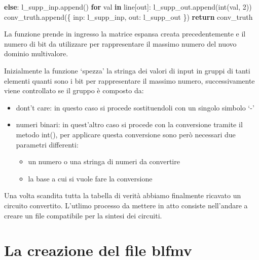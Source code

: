 \documentclass[
  italian,
]{book}
\newenvironment{Shaded}{\begin{snugshade}}{\end{snugshade}}
\newcommand{\BuiltInTok}[1]{#1}
\newcommand{\ControlFlowTok}[1]{\textcolor[rgb]{0.13,0.29,0.53}{\textbf{#1}}}
\newcommand{\DecValTok}[1]{\textcolor[rgb]{0.00,0.00,0.81}{#1}}
\newcommand{\KeywordTok}[1]{\textcolor[rgb]{0.13,0.29,0.53}{\textbf{#1}}}
\newcommand{\NormalTok}[1]{#1}
\newcommand{\StringTok}[1]{\textcolor[rgb]{0.31,0.60,0.02}{#1}}
\providecommand{\tightlist}{%
  \setlength{\itemsep}{0pt}\setlength{\parskip}{0pt}}
\begin{document}
\begin{Shaded}
\begin{Highlighting}[]
        \ControlFlowTok{else}\NormalTok{:}
\NormalTok{          l\_supp\_inp.append(}\StringTok{\textquotesingle{}{-}\textquotesingle{}}\NormalTok{)}
      \ControlFlowTok{for}\NormalTok{ val }\KeywordTok{in}\NormalTok{ line[}\StringTok{\textquotesingle{}out\textquotesingle{}}\NormalTok{]:}
\NormalTok{        l\_supp\_out.append(}\BuiltInTok{int}\NormalTok{(val, }\DecValTok{2}\NormalTok{))}
\NormalTok{      conv\_truth.append(\{}
        \StringTok{\textquotesingle{}inp\textquotesingle{}}\NormalTok{:  l\_supp\_inp,}
        \StringTok{\textquotesingle{}out\textquotesingle{}}\NormalTok{:  l\_supp\_out}
\NormalTok{      \})}
  \ControlFlowTok{return}\NormalTok{ conv\_truth}
\end{Highlighting}
\end{Shaded}

La funzione prende in ingresso la matrice espansa creata precedentemente e il numero di bit da utilizzare per rappresentare il massimo numero del nuovo dominio multivalore.

\newpage

Inizialmente la funzione `spezza' la stringa dei valori di input in gruppi di tanti elementi quanti sono i bit per rappresentare il massimo numero, successivamente viene controllato se il gruppo è composto da:

\begin{itemize}
\tightlist
\item
  dont't care: in questo caso si procede sostituendoli con un singolo simbolo `-'
\item
  numeri binari: in quest'altro caso si procede con la conversione tramite il metodo int(), per applicare questa conversione sono però necessari due parametri differenti:

  \begin{itemize}
  \tightlist
  \item
    un numero o una stringa di numeri da convertire
  \item
    la base a cui si vuole fare la conversione
  \end{itemize}
\end{itemize}

Una volta scandita tutta la tabella di verità abbiamo finalmente ricavato un circuito convertito. L'utlimo processo da mettere in atto consiste nell'andare a creare un file compatibile per la sintesi dei circuiti.

\hypertarget{la-creazione-del-file-blfmv}{%
\section{La creazione del file blfmv}\label{la-creazione-del-file-blfmv}}
\end{document}
